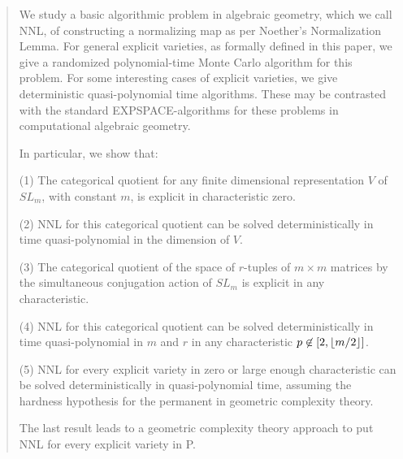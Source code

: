 \documentclass[11pt]{article}
\begin{document}
\begin{abstract} 
We study a basic algorithmic  problem in   algebraic geometry, which we call  NNL,  of constructing
a normalizing map as per Noether's Normalization Lemma.
For general explicit varieties, as formally defined in this paper,
we give a randomized polynomial-time
Monte Carlo algorithm for this problem.
For some interesting  cases of 
explicit varieties, we  give deterministic quasi-polynomial time algorithms.
These  may be contrasted with  the  standard 
EXPSPACE-algorithms for these problems in computational algebraic geometry.


In particular, we show that:
\smallskip

(1)  The categorical quotient  for
any  finite dimensional  representation $V$  of $SL_m$, with constant $m$,
is explicit in characteristic zero. 

(2) NNL for this categorical quotient  can be solved deterministically in time quasi-polynomial in the dimension of 
$V$.


(3)  The categorical quotient of the space of $r$-tuples
of $m \times m$ matrices by 
the simultaneous conjugation action of $SL_m$ is 
explicit  in any characteristic. 

(4) NNL for this categorical quotient  can be solved 
deterministically in time quasi-polynomial in $m$ and $r$ in any characteristic $p \not \in [2,\floor{m/2}]$.


(5) NNL for every  explicit variety in zero or large enough characteristic
can be solved  deterministically in  quasi-polynomial time, assuming 
the  hardness hypothesis for the permanent in geometric complexity theory. 


The last result leads to a  geometric complexity theory approach to  put NNL for every explicit variety in P.
\end{abstract} 




%
\end{document}
